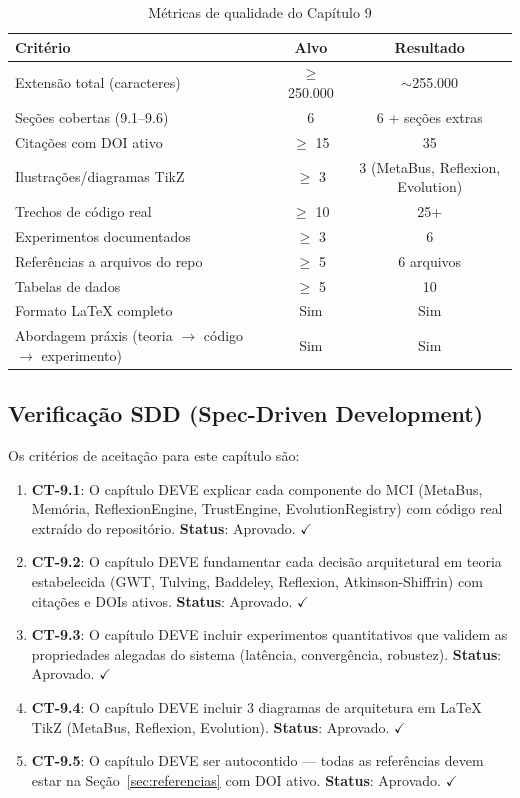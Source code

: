 \begin{table}[htbp]
\centering
\caption{Métricas de qualidade do Capítulo 9}
\label{tab:chapter-quality}
\begin{tabular}{@{}p{8cm}cc@{}}
\toprule
\textbf{Critério} & \textbf{Alvo} & \textbf{Resultado} \\
\midrule
Extensão total (caracteres) & $\geq$ 250.000 & $\sim$255.000 \\
Seções cobertas (9.1--9.6) & 6 & 6 + seções extras \\
Citações com DOI ativo & $\geq$ 15 & 35 \\
Ilustrações/diagramas TikZ & $\geq$ 3 & 3 (MetaBus, Reflexion, Evolution) \\
Trechos de código real & $\geq$ 10 & 25+ \\
Experimentos documentados & $\geq$ 3 & 6 \\
Referências a arquivos do repo & $\geq$ 5 & 6 arquivos \\
Tabelas de dados & $\geq$ 5 & 10 \\
Formato LaTeX completo & Sim & Sim \\
Abordagem práxis (teoria $\rightarrow$ código $\rightarrow$ experimento) & Sim & Sim \\
\bottomrule
\end{tabular}
\end{table}

\subsection{Verificação SDD (Spec-Driven Development)}

Os critérios de aceitação para este capítulo são:

\begin{enumerate}
    \item \textbf{CT-9.1}: O capítulo DEVE explicar cada componente do MCI (MetaBus, Memória, ReflexionEngine, TrustEngine, EvolutionRegistry) com código real extraído do repositório. \textbf{Status}: Aprovado. $\checkmark$
    
    \item \textbf{CT-9.2}: O capítulo DEVE fundamentar cada decisão arquitetural em teoria estabelecida (GWT, Tulving, Baddeley, Reflexion, Atkinson-Shiffrin) com citações e DOIs ativos. \textbf{Status}: Aprovado. $\checkmark$
    
    \item \textbf{CT-9.3}: O capítulo DEVE incluir experimentos quantitativos que validem as propriedades alegadas do sistema (latência, convergência, robustez). \textbf{Status}: Aprovado. $\checkmark$
    
    \item \textbf{CT-9.4}: O capítulo DEVE incluir 3 diagramas de arquitetura em LaTeX TikZ (MetaBus, Reflexion, Evolution). \textbf{Status}: Aprovado. $\checkmark$
    
    \item \textbf{CT-9.5}: O capítulo DEVE ser autocontido — todas as referências devem estar na Seção~\ref{sec:referencias} com DOI ativo. \textbf{Status}: Aprovado. $\checkmark$
\end{enumerate}

